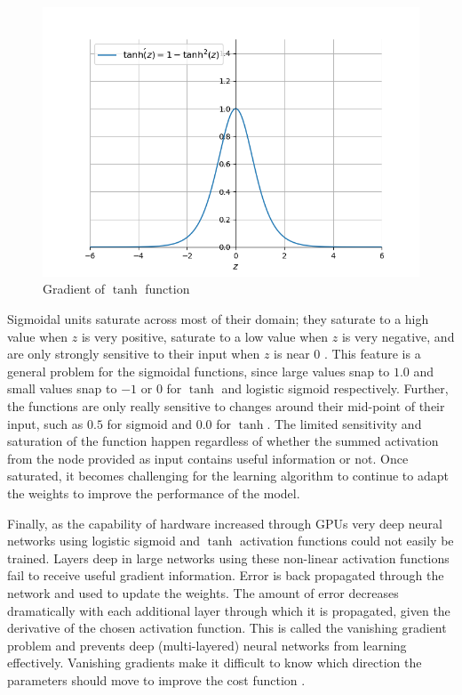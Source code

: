 \documentclass[12pt]{report}
\numberwithin{equation}{section}
\begin{document}
\begin{figure}[htb!]
\centering 
\includegraphics[scale=0.9]{png/tanh_prime.png} 
\caption{Gradient of $\tanh$ function}
\label{fig:tanh_prime}
\end{figure}

Sigmoidal units saturate across most of their domain; they saturate to a high value when $z$ is very positive, saturate to a low value when $z$ is very negative, and are only strongly sensitive to their input when $z$ is near $0$ {\cite{10.5555/3086952}}. This feature is a general problem for the sigmoidal functions, since large values snap to $1.0$ and small values snap to $-1$ or $0$ for $\tanh$ and logistic sigmoid respectively. Further, the functions are only really sensitive to changes around their mid-point of their input, such as $0.5$ for sigmoid and $0.0$ for $\tanh$. The limited sensitivity and saturation of the function happen regardless of whether the summed activation from the node provided as input contains useful information or not. Once saturated, it becomes challenging for the learning algorithm to continue to adapt the weights to improve the performance of the model. 

Finally, as the capability of hardware increased through GPUs very deep neural networks using logistic sigmoid and $\tanh$ activation functions could not easily be trained. Layers deep in large networks using these non-linear activation functions fail to receive useful gradient information. Error is back propagated through the network and used to update the weights. The amount of error decreases dramatically with each additional layer through which it is propagated, given the derivative of the chosen activation function. This is called the {vanishing gradient problem} and prevents deep (multi-layered) neural networks from learning effectively. Vanishing gradients make it difficult to know which direction the parameters should move to improve the cost function {\cite{10.5555/3086952}}.
\end{document}
